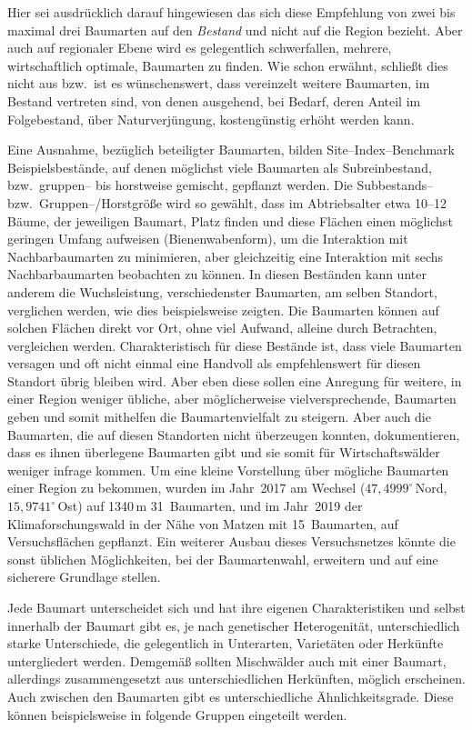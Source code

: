 \documentclass[twocolumn]{scrartcl}
\begin{document}
Hier sei ausdrücklich darauf hingewiesen das sich diese Empfehlung von zwei bis
maximal drei Baumarten auf den \emph{Bestand} und nicht auf die Region bezieht.
Aber auch auf regionaler Ebene wird es gelegentlich schwerfallen, mehrere,
wirtschaftlich optimale, Baumarten zu finden. Wie schon erwähnt, schließt dies
nicht aus bzw.\ ist es wünschenswert, dass vereinzelt weitere Baumarten,
im Bestand vertreten sind, von denen ausgehend, bei Bedarf, deren Anteil im
Folgebestand, über Naturverjüngung, kostengünstig erhöht werden kann.

Eine Ausnahme, bezüglich beteiligter Baumarten, bilden Site--Index--Benchmark
Beispielsbestände, auf denen möglichst viele Baumarten als Subreinbestand, bzw.\
gruppen-- bis horstweise gemischt, gepflanzt werden. Die Subbestands-- bzw.\
Gruppen--/Horstgröße wird so gewählt, dass im Abtriebsalter etwa 10--12 Bäume,
der jeweiligen Baumart, Platz finden und diese Flächen einen möglichst geringen
Umfang aufweisen (Bienenwabenform), um die Interaktion mit Nachbarbaumarten zu
minimieren, aber gleichzeitig eine Interaktion mit sechs Nachbarbaumarten
beobachten zu können. In diesen Beständen kann unter anderem die Wuchsleistung,
verschiedenster Baumarten, am selben Standort, verglichen werden, wie dies
beispielsweise \cite{mayer1970anbauversuch} zeigten. Die Baumarten können auf
solchen Flächen direkt vor Ort, ohne viel Aufwand, alleine durch Betrachten,
vergleichen werden. Charakteristisch für diese Bestände ist, dass viele
Baumarten versagen und oft nicht einmal eine Handvoll als empfehlenswert für
diesen Standort übrig bleiben wird. Aber eben diese sollen eine Anregung für
weitere, in einer Region weniger übliche, aber möglicherweise vielversprechende,
Baumarten geben und somit mithelfen die Baumartenvielfalt zu steigern. Aber auch
die Baumarten, die auf diesen Standorten nicht überzeugen konnten,
dokumentieren, dass es ihnen überlegene Baumarten gibt und sie somit für
Wirtschaftswälder weniger infrage kommen. Um eine kleine Vorstellung über
mögliche Baumarten einer Region zu bekommen, wurden im Jahr~2017 am Wechsel
($47,4999^{\circ}$\,Nord, $15,9741^{\circ}$\,Ost) auf 1340\,m 31~Baumarten, und
im Jahr~2019 der Klimaforschungswald in der Nähe von Matzen mit 15~Baumarten,
auf Versuchsflächen gepflanzt. Ein weiterer Ausbau dieses Versuchsnetzes könnte
die sonst üblichen Möglichkeiten, bei der Baumartenwahl, erweitern und auf eine
sicherere Grundlage stellen.

Jede Baumart unterscheidet sich und hat ihre eigenen Charakteristiken und selbst innerhalb der Baumart gibt es, je nach genetischer Heterogenität, unterschiedlich starke Unterschiede, die gelegentlich in Unterarten, Varietäten oder Herkünfte untergliedert werden. Demgemäß sollten Mischwälder auch mit einer Baumart, allerdings zusammengesetzt aus unterschiedlichen Herkünften, möglich erscheinen. Auch zwischen den Baumarten gibt es unterschiedliche Ähnlichkeitsgrade. Diese können beispielsweise in folgende Gruppen eingeteilt werden.
\end{document}
